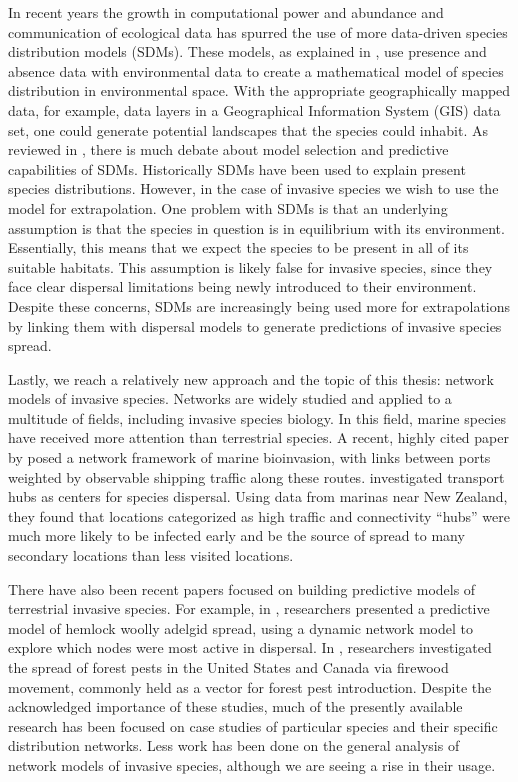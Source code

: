 \documentclass[12pt, openany]{book}
\theoremstyle{definition}
\theoremstyle{remark}
\numberwithin{equation}{chapter}
\numberwithin{figure}{chapter}
\begin{document}
In recent years the growth in computational power and abundance and communication of ecological data has spurred the use of more data-driven species distribution models (SDMs). These models, as explained in \cite{vaclavik2009invasive}, use presence and absence data with environmental data to create a mathematical model of species distribution in environmental space. With the appropriate geographically mapped data, for example, data layers in a Geographical Information System (GIS) data set, one could generate potential landscapes that the species could inhabit. As reviewed in \cite{elith2009species}, there is much debate about model selection and predictive capabilities of SDMs. Historically SDMs have been used to explain present species distributions. However, in the case of invasive species we wish to use the model for extrapolation. One problem with SDMs is that an underlying assumption is that the species in question is in equilibrium with its environment. Essentially, this means that we expect the species to be present in all of its suitable habitats. This assumption is likely false for invasive species, since they face clear dispersal limitations being newly introduced to their environment. Despite these concerns, SDMs are increasingly being used more for extrapolations by linking them with dispersal models to generate predictions of invasive species spread.

Lastly, we reach a relatively new approach and the topic of this thesis: network models of invasive species. Networks are widely studied and applied to a multitude of fields, including invasive species biology. In this field, marine species have received more attention than terrestrial species. A recent, highly cited paper by \cite{kaluza2010complex} posed a network framework of marine bioinvasion, with links between ports weighted by observable shipping traffic along these routes. \cite{floerl2009importance} investigated transport hubs as centers for species dispersal. Using data from marinas near New Zealand, they found that locations categorized as high traffic and connectivity ``hubs'' were much more likely to be infected early and be the source of spread to many secondary locations than less visited locations. 

There have also been recent papers focused on building predictive models of terrestrial invasive species. For example, in \cite{ferrari2014modeling}, researchers presented a predictive model of hemlock woolly adelgid spread, using a dynamic network model to explore which nodes were most active in dispersal. In \cite{koch2014using}, researchers investigated the spread of forest pests in the United States and Canada via firewood movement, commonly held as a vector for forest pest introduction. Despite the acknowledged importance of these studies, much of the presently available research has been focused on case studies of particular species and their specific distribution networks. Less work has been done on the general analysis of network models of invasive species, although we are seeing a rise in their usage. 
\end{document}

